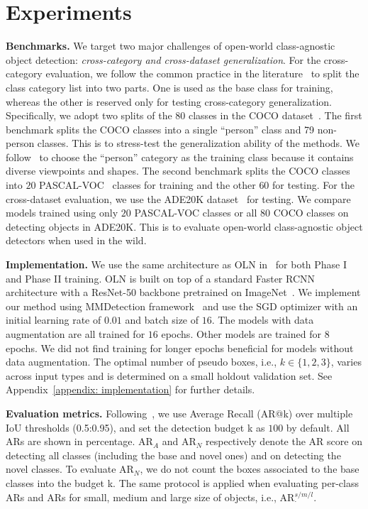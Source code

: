 \documentclass{article} \usepackage{iclr2023_conference,times}
\begin{document}
\section{Experiments}
\textbf{Benchmarks.}
We target two major challenges of open-world class-agnostic object detection: \textit{cross-category and cross-dataset generalization}. 
For the cross-category evaluation, we follow the common practice in the literature~\citep{kim_learning_2021,wang2022open} to split the class category list into two parts. One is used as the base class for training, whereas the other is reserved only for testing cross-category generalization. Specifically, we adopt two splits of the $80$ classes in the COCO dataset~\citep{CoCodataset}.
The first benchmark splits the COCO classes into a single ``person'' class and 79 non-person classes. This is to stress-test the generalization ability of the methods. We follow~\cite{wang2022open} to choose the ``person'' category as the training class because it contains diverse viewpoints and shapes. The second benchmark splits the COCO classes into $20$ PASCAL-VOC~\citep{Everingham10} classes for training and the other $60$ for testing. 
For the cross-dataset evaluation, we use the ADE20K dataset~\citep{zhou2019semantic} for testing. We compare models trained using only $20$ PASCAL-VOC classes or all $80$ COCO classes on detecting objects in ADE20K.
This is to evaluate open-world class-agnostic object detectors when used in the wild.


\textbf{Implementation.}
We use the same architecture as OLN in~\citep{kim_learning_2021} for both Phase I and Phase II training. OLN is built on top of a standard Faster RCNN \citep{ren_faster_2015} architecture with a ResNet-50 backbone pretrained on ImageNet~\citep{imagenet_cvpr09}. We implement our method using MMDetection framework~\citep{mmdetection} and use the SGD optimizer with an initial learning rate of $0.01$ and batch size of $16$. The models with data augmentation are all trained for $16$ epochs. Other models are trained for $8$ epochs. 
We did not find training for longer epochs beneficial for models without data augmentation.
The optimal number of pseudo boxes, i.e., $k\in\{1,2,3\}$, varies across input types and is determined on a small holdout validation set.
See Appendix~\ref{appendix: implementation} for further  details. 



\textbf{Evaluation metrics.}
Following~\citep{kim_learning_2021, wang2022open}, we use Average Recall (AR@k) over multiple IoU thresholds (0.5:0.95), and set the detection budget k as $100$ by default. All ARs are shown in percentage. AR$_{A}$ and AR$_{N}$ respectively denote the AR score on detecting all classes (including the base and novel ones) and on detecting the novel classes. To evaluate AR$_{N}$, we do not count the boxes associated to the base classes into the budget k. The same protocol is applied when evaluating per-class ARs and ARs for small, medium and large size of objects, i.e., AR$_{\cdot}^{s/m/l}$. 
\end{document}
